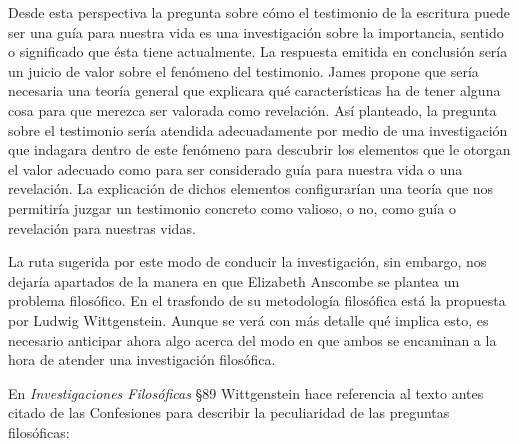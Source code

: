 
        Desde esta perspectiva la pregunta sobre cómo el testimonio de la escritura
        puede ser una guía para nuestra vida es una investigación sobre la importancia,
        sentido o significado que ésta tiene actualmente. La respuesta emitida en
        conclusión sería un juicio de valor sobre el fenómeno del testimonio. James
        propone que sería necesaria una teoría general que explicara qué características
        ha de tener alguna cosa para que merezca ser valorada como revelación. Así
        planteado, la pregunta sobre el testimonio sería atendida adecuadamente por
        medio de una investigación que indagara dentro de este fenómeno para descubrir
        los elementos que le otorgan el valor adecuado como para ser considerado guía
        para nuestra vida o una revelación. La explicación de dichos elementos
        configurarían una teoría que nos permitiría juzgar un testimonio concreto como
        valioso, o no, como guía o revelación para nuestras vidas.

        La ruta sugerida por este modo de conducir la investigación, sin embargo, nos
        dejaría apartados de la manera en que Elizabeth Anscombe se plantea un problema
        filosófico. En el trasfondo de su metodología filosófica está la propuesta por
        Ludwig Wittgenstein. Aunque se verá con más detalle qué implica esto, es
        necesario anticipar ahora algo acerca del modo en que ambos se encaminan a la
        hora de atender una investigación filosófica.

        En \emph{Investigaciones Filosóficas} \S89 Wittgenstein hace referencia al
        texto antes citado de las Confesiones para describir la peculiaridad de las
        preguntas filosóficas:

